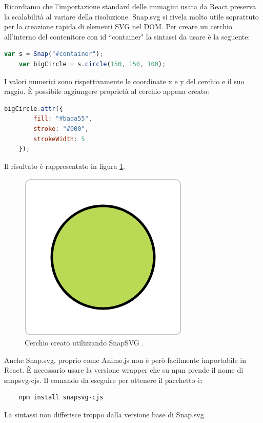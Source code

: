 \noindent Ricordiamo che l'importazione standard delle immagini usata da React preserva la scalabilità al variare della risoluzione.\newline
Snap.svg si rivela molto utile soprattuto per la creazione rapida di elementi SVG nel DOM.
Per creare un cerchio all'interno del contenitore con id ``container" la sintassi da usare è la seguente:
\begin{lstlisting}[language=JavaScript]
    var s = Snap("#container");
    var bigCircle = s.circle(150, 150, 100);
\end{lstlisting}
I valori numerici sono rispettivamente le coordinate x e y del cerchio e il suo raggio.
È possibile  aggiungere proprietà al cerchio appena creato:
\begin{lstlisting}[language=JavaScript]
    bigCircle.attr({
        fill: "#bada55",
        stroke: "#000",
        strokeWidth: 5
    });
\end{lstlisting}
Il risultato è rappresentato in figura \ref{fig:snapCircle}.
\begin{figure}[H]
    \centering
    \includegraphics[width=0.45\linewidth]{img/snapCircle.png}
    \caption{Cerchio creato utilizzando SnapSVG \cite{snapSite}.}
    \label{fig:snapCircle}
\end{figure}

\noindent Anche Snap.svg, proprio come Anime.js non è però facilmente importabile in React.\newline
È necessario usare la versione wrapper che su npm prende il nome di snapsvg-cjs.
Il comando da eseguire per ottenere il pacchetto è:
\begin{verbatim}
    npm install snapsvg-cjs
\end{verbatim}
La sintassi non differisce troppo dalla versione base di Snap.svg